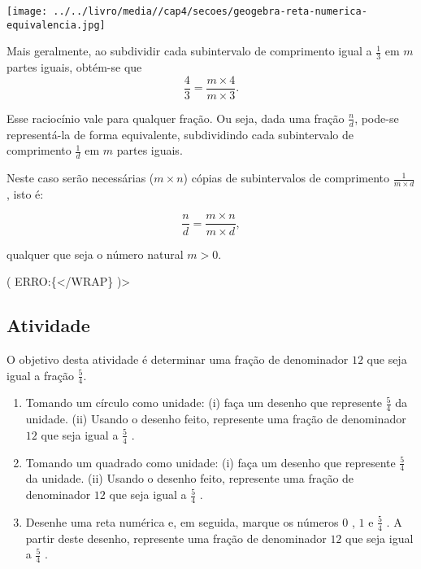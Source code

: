 \documentclass[a4,12pt]{book}
\begin{document}
\texttt{[image: ../../livro/media//cap4/secoes/geogebra-reta-numerica-equivalencia.jpg]}

Mais geralmente, ao subdividir cada subintervalo de comprimento igual a $\frac{1}{3}$ em $m$ partes iguais, obtém-se que
$$\dfrac{4}{3} = \dfrac{m \times 4}{m \times 3}.$$

Esse raciocínio vale para qualquer fração. Ou seja, dada uma fração $\frac{n}{d}$, pode-se representá-la de forma equivalente, subdividindo cada subintervalo de comprimento $\frac{1}{d}$ em $m$ partes iguais. 

Neste caso serão necessárias ($m \times n$) cópias de subintervalos de comprimento $\frac{1}{m \times d}$, isto é:

$$\dfrac{n}{d} = \dfrac{m \times n}{m \times d},$$

qualquer que seja o número natural $m > 0$.

( ERRO:\{</WRAP\} )>





\subsection{Atividade}








O objetivo desta atividade é determinar uma fração de denominador $12$ que seja igual a fração $\frac{5}{4}$.

\begin{enumerate} [\quad a)] %
  \item     Tomando um círculo como unidade: (i) faça um desenho que represente     $\frac{5}{4}$     da unidade. (ii) Usando o desenho feito, represente uma fração de denominador     $12$     que seja igual a     $\frac{5}{4}$    . 
  \item     Tomando um quadrado como unidade: (i) faça um desenho que represente     $\frac{5}{4}$     da unidade. (ii) Usando o desenho feito, represente uma fração de denominador     $12$     que seja igual a     $\frac{5}{4}$    . 
  \item     Desenhe uma reta numérica e, em seguida, marque os números     $0$    ,     $1$     e     $\frac{5}{4}$    . A partir deste desenho, represente uma fração de denominador     $12$     que seja igual a     $\frac{5}{4}$    . 
\end{enumerate} %
\end{document}
